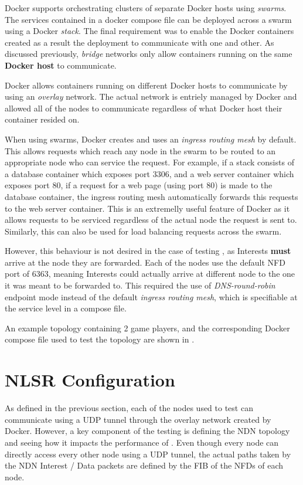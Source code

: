 Docker supports orchestrating clusters of separate Docker hosts using \textit{swarms}. The services contained in a docker compose file can be deployed across a swarm using a Docker \textit{stack}. The final requirement was to enable the Docker containers created as a result the deployment to communicate with one and other. As discussed previously, \textit{bridge} networks only allow containers running on the same \textbf{Docker host} to communicate.

Docker allows containers running on different Docker hosts to communicate by using an \textit{overlay} network. The actual network is entriely managed by Docker and allowed all of the \game{} nodes to communicate regardless of what Docker host their container resided on. 

When using swarms, Docker creates and uses an \textit{ingress routing mesh} by default. This allows requests which reach any node in the swarm to be routed to an appropriate node who can service the request. For example, if a stack consists of a database container which exposes port 3306, and a web server container which exposes port 80, if a request for a web page (using port 80) is made to the database container, the ingress routing mesh automatically forwards this requests to the web server container. This is an extremelly useful feature of Docker as it allows requests to be serviced regardless of the actual node the request is sent to. Similarly, this can also be used for load balancing requests across the swarm.

However, this behaviour is not desired in the case of testing \game{}, as Interests \textbf{must} arrive at the node they are forwarded. Each of the nodes use the default NFD port of 6363, meaning Interests could actually arrive at different node to the one it was meant to be forwarded to. This required the use of \textit{DNS-round-robin} endpoint mode instead of the default \textit{ingress routing mesh}, which is specifiable at the service level in a compose file.

An example topology containing 2 game players, and the corresponding Docker compose file used to test the topology are shown in .



\section{NLSR Configuration}\label{sec:impl:topologies}
As defined in the previous section, each of the nodes used to test \game{} can communicate using a UDP tunnel through the overlay network created by Docker. However, a key component of the testing is defining the NDN topology and seeing how it impacts the performance of \game{}. Even though every node can directly access every other node using a UDP tunnel, the actual paths taken by the NDN Interest / Data packets are defined by the FIB of the NFDs of each node. 


